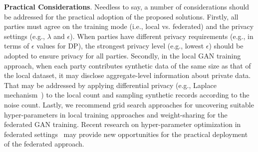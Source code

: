 \documentclass[conference]{IEEEtran}
\newcommand{\partitle}[1]{\smallskip \noindent \textbf{#1}.}
\begin{document}
\partitle{Practical Considerations} Needless to say, a number of considerations should be addressed for the practical adoption of the proposed solutions. Firstly, all parties must agree on the training mode (i.e., local vs. federated) and the privacy settings (e.g., $\lambda$ and $\epsilon$). When parties have different privacy requirements (e.g., in terms of $\epsilon$ values for DP), the strongest privacy level (e.g., lowest $\epsilon$) should be adopted to ensure privacy for all parties. Secondly, in the local GAN training approach, when each party contributes synthetic data of the same size as that of the local dataset, it may disclose aggregate-level information about private data.  That may be addressed by applying differential privacy (e.g., Laplace mechanism~\cite{dwork_book}) to the local count and sampling synthetic records according to the noise count. Lastly, we recommend grid search approaches for uncovering suitable hyper-parameters in local training approaches and weight-sharing for the federated GAN training. Recent research on hyper-parameter optimization in federated settings~\cite{khodak2021federated} may provide new opportunities for the practical deployment of the federated approach.  
















\end{document}
